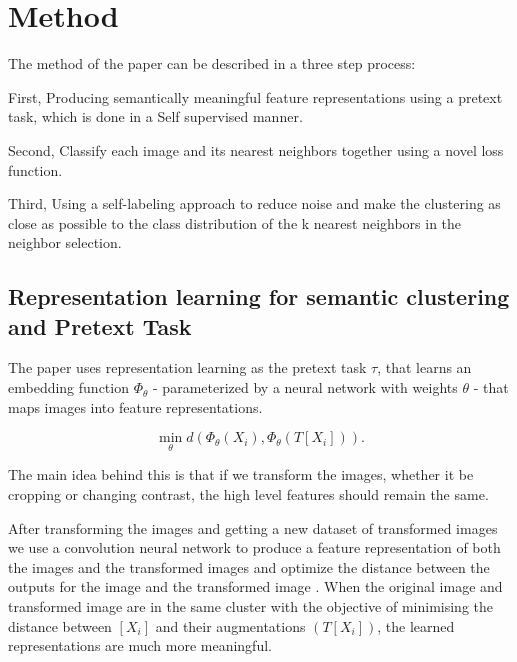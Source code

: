 
\newpage

\section{Method}
\label{sec:method}

The method of the paper can be described in a three step process:

\medskip

First, Producing semantically meaningful feature representations using a pretext task, which is done in a Self supervised manner. 

\medskip

Second, Classify each image and its nearest neighbors together using a novel loss function.

\medskip

Third, Using a self-labeling approach to reduce noise and make the clustering as close as possible to the class distribution of the k nearest neighbors in the neighbor selection. 

\subsection{Representation learning for semantic clustering and Pretext Task}


The paper uses representation learning as the  pretext task $\tau$, that learns an embedding function $\Phi_\theta$ - parameterized by a neural network with weights $\theta$ - that maps images into feature representations.

\begin{equation}
\label{eq:pretext_task}
    \min_{\theta}d(\Phi_\theta(X_i), \Phi_\theta(T[X_i])).
\end{equation}

The main idea behind this is that if we transform the images, whether it be cropping or changing contrast, the high level features should remain the same. 

\medskip

After  transforming the images and getting a new dataset of transformed images we use a convolution neural network to produce a feature representation of both the images and the transformed images and optimize the distance between the outputs for the image and the transformed image . When the original image and transformed image are in the same cluster with the objective of minimising the distance between $[X_i]$ and their augmentations $(T[X_i])$, the learned representations are much more meaningful.




